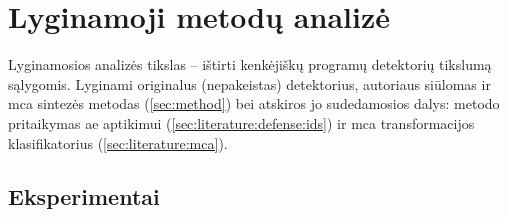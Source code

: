 \section{Lyginamoji metodų analizė}\label{sec:experiments}

Lyginamosios analizės tikslas -- ištirti kenkėjiškų programų detektorių tikslumą  sąlygomis. Lyginami originalus (nepakeistas) detektorius, autoriaus siūlomas \LIME ir \gls{mca} sintezės metodas (\ref{sec:method}) bei atskiros jo sudedamosios dalys: \LIME metodo pritaikymas \gls{ae} aptikimui (\ref{sec:literature:defense:ids}) ir \gls{mca} transformacijos klasifikatorius (\ref{sec:literature:mca}).



\clearpage
\subsection{Eksperimentai}

\clearpage

\clearpage

\clearpage
